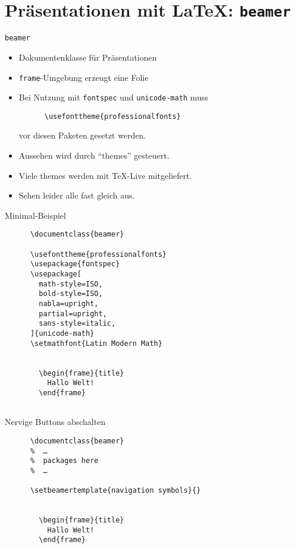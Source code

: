 \section{Präsentationen mit \LaTeX: \lstinline+beamer+}

\begin{frame}[fragile]{\lstinline+beamer+}
  \begin{itemize}
    \item Dokumentenklasse für Präsentationen
    \item \lstinline+frame+-Umgebung erzeugt eine Folie
    \item Bei Nutzung mit \lstinline+fontspec+ und \lstinline+unicode-math+ muss
      \begin{lstlisting}
      \usefonttheme{professionalfonts}
      \end{lstlisting}
      vor diesen Paketen gesetzt werden.
    \item Aussehen wird durch \enquote{themes} gesteuert.
    \item Viele themes werden mit \TeX-Live mitgeliefert.
    \item Sehen leider alle fast gleich aus.
  \end{itemize}
\end{frame}
\begin{frame}[fragile]{Minimal-Beispiel}
  \begin{center}
    \begin{lstlisting}
      \documentclass{beamer}

      \usefonttheme{professionalfonts}
      \usepackage{fontspec}
      \usepackage[
        math-style=ISO,
        bold-style=ISO,
        nabla=upright,
        partial=upright,
        sans-style=italic,
      ]{unicode-math}
      \setmathfont{Latin Modern Math}

      
        \begin{frame}{title}
          Hallo Welt!
        \end{frame}
      
    \end{lstlisting}
  \end{center}
\end{frame}

\begin{frame}[fragile]{Nervige Buttons abschalten}
  \begin{center}
    \begin{lstlisting}
      \documentclass{beamer}
      %  …
      %  packages here
      %  …

      \setbeamertemplate{navigation symbols}{}

      
        \begin{frame}{title}
          Hallo Welt!
        \end{frame}
      
    \end{lstlisting}
  \end{center}
\end{frame}


